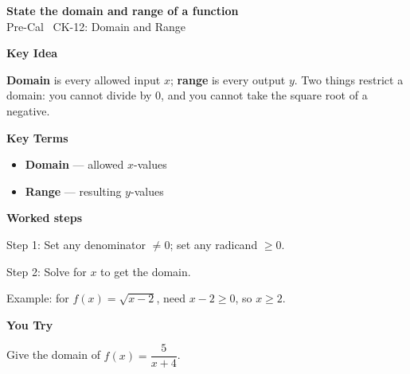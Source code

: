 \documentclass[12pt]{article}
\begin{document}
\begin{center}{\Large \textbf{State the domain and range of a function}}\\[2pt]{\small Pre-Cal \textbar\ CK-12: Domain and Range}\end{center}\vspace{0.25cm}

{\large\textbf{Key Idea}}\par\smallskip
\textbf{Domain} is every allowed input $x$; \textbf{range} is every output $y$. Two things restrict a domain: you cannot divide by 0, and you cannot take the square root of a negative.\par


{\large\textbf{Key Terms}}\par\smallskip
\begin{itemize}[leftmargin=1.4em]
  \item \textbf{Domain} — allowed $x$-values
  \item \textbf{Range} — resulting $y$-values
\end{itemize}


{\large\textbf{Worked steps}}\par\smallskip
Step 1: Set any denominator $\neq 0$; set any radicand $\ge 0$.\par
Step 2: Solve for $x$ to get the domain.\par
Example: for $f(x)=\sqrt{x-2}$, need $x-2\ge 0$, so $x\ge 2$.\par


{\large\textbf{You Try}}\par\smallskip
Give the domain of $f(x)=\dfrac{5}{x+4}$.\par
\end{document}
